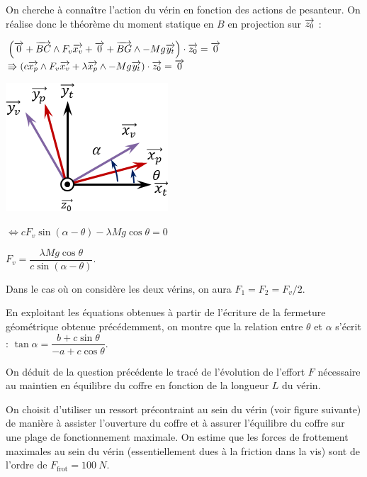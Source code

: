 \documentclass[10pt,fleqn]{article} %
\begin{document}
\begin{multicols}{2}
\begin{multicols}{2}
\begin{corrige}
On cherche à connaître l'action du vérin en fonction des actions de pesanteur. On réalise donc le théorème du moment statique en $B$ en projection sur $\overrightarrow{z_0}$ : 

$ \left( 
\overrightarrow{0} + \overrightarrow{BC}\wedge F_v\overrightarrow{x_v}
+ \overrightarrow{0} + \overrightarrow{BG}\wedge -Mg\overrightarrow{y_t}
\right) \cdot \overrightarrow{z_0} = \overrightarrow{0} $
$\Rrightarrow \left( c\overrightarrow{x_p}\wedge F_v\overrightarrow{x_v} + \lambda \overrightarrow{x_p}\wedge -Mg\overrightarrow{y_t}
\right) \cdot \overrightarrow{z_0} = \overrightarrow{0} $

\begin{center}
\includegraphics[width=.5\linewidth]{images/cor_03}

$\Leftrightarrow  c F_v\sin \left( \alpha - \theta\right) - \lambda Mg\cos \theta  = {0} $

$   F_v = \dfrac{\lambda Mg\cos \theta}{c\sin \left( \alpha - \theta\right)} $.

Dans le cas où on considère les deux vérins, on aura $F_1=F_2=F_v/2$.

\end{center}


\end{corrige}


\else
\fi

En exploitant les équations obtenues à partir de l’écriture de la fermeture géométrique obtenue précédemment, on montre que la relation entre $\theta$ et $\alpha$ s’écrit : 
$ \tan \alpha = \dfrac{b+c\sin\theta}{-a+c\cos\theta}$.

On déduit de la question précédente le tracé de l’évolution de l’effort $F$ nécessaire au maintien en équilibre du coffre en fonction de la longueur $L$ du vérin.


On choisit d’utiliser un ressort précontraint au sein du vérin (voir figure suivante) de manière à assister l’ouverture du coffre et à assurer l’équilibre du coffre sur une plage de fonctionnement maximale. On estime que les forces de frottement maximales au sein du vérin (essentiellement dues à la friction dans la vis) sont de l’ordre de $F_{\text{frot}}=\SI{100}{N}$. 




\end{multicols}
\end{multicols}
\end{document}
